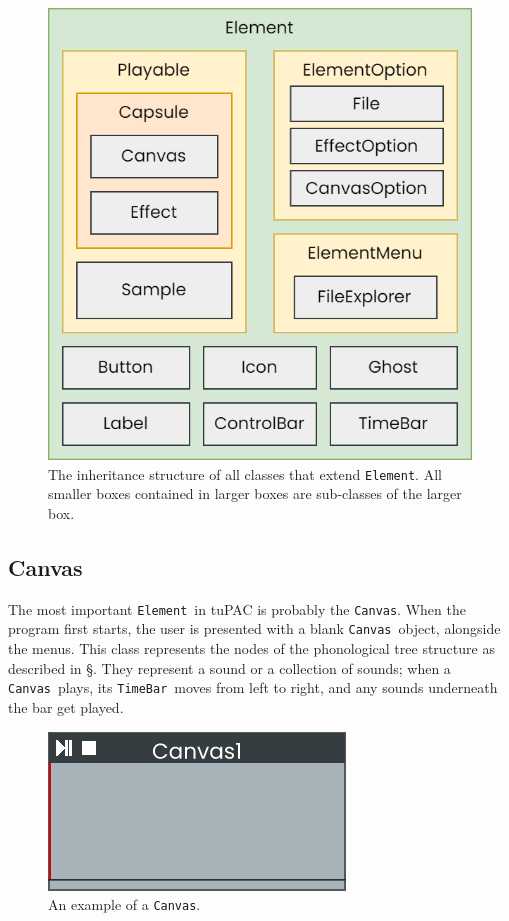 \documentclass[12pt,a4paper,twoside,openright]{report}
\newcommand{\element}{\texttt{Element}}
\newcommand{\canvas}{\texttt{Canvas}}
\newcommand{\timebar}{\texttt{TimeBar}}
\begin{document}
\begin{figure}[h]
    \centering
    \includegraphics[scale=0.6]{images/tupac_class_structure.png}
    \caption{The inheritance structure of all classes that extend \element. All smaller boxes contained in larger boxes are sub-classes of the larger box.}
    \label{fig:element_inheritance}
\end{figure}

\subsection{Canvas}
The most important \element\ in tuPAC is probably the \canvas. When the program first starts, the user is presented with a blank \canvas\ object, alongside the menus. This class represents the nodes of the phonological tree structure as described in \S{}. They represent a sound or a collection of sounds; when a \canvas\ plays, its \timebar\ moves from left to right, and any sounds underneath the bar get played.

\begin{figure}[h]
    \centering
    \includegraphics{images/canvas.png}
    \caption{An example of a \canvas.}
    \label{fig:canvas}
\end{figure}
\end{document}
